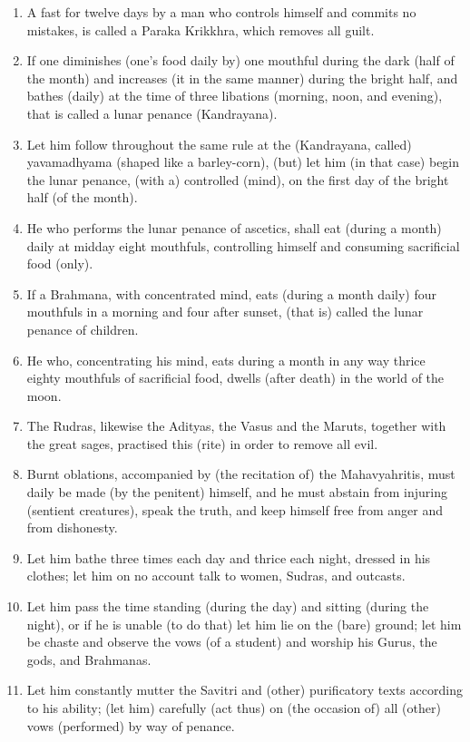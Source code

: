 \begin{enumerate}
\item A fast for twelve days by a man who controls himself and commits no mistakes, is called a Paraka Krikkhra, which removes all guilt.
\item If one diminishes (one's food daily by) one mouthful during the dark (half of the month) and increases (it in the same manner) during the bright half, and bathes (daily) at the time of three libations (morning, noon, and evening), that is called a lunar penance (Kandrayana).
\item Let him follow throughout the same rule at the (Kandrayana, called) yavamadhyama (shaped like a barley-corn), (but) let him (in that case) begin the lunar penance, (with a) controlled (mind), on the first day of the bright half (of the month).
\item He who performs the lunar penance of ascetics, shall eat (during a month) daily at midday eight mouthfuls, controlling himself and consuming sacrificial food (only).
\item If a Brahmana, with concentrated mind, eats (during a month daily) four mouthfuls in a morning and four after sunset, (that is) called the lunar penance of children.
\item He who, concentrating his mind, eats during a month in any way thrice eighty mouthfuls of sacrificial food, dwells (after death) in the world of the moon.
\item The Rudras, likewise the Adityas, the Vasus and the Maruts, together with the great sages, practised this (rite) in order to remove all evil.
\item Burnt oblations, accompanied by (the recitation of) the Mahavyahritis, must daily be made (by the penitent) himself, and he must abstain from injuring (sentient creatures), speak the truth, and keep himself free from anger and from dishonesty.
\item Let him bathe three times each day and thrice each night, dressed in his clothes; let him on no account talk to women, Sudras, and outcasts.
\item Let him pass the time standing (during the day) and sitting (during the night), or if he is unable (to do that) let him lie on the (bare) ground; let him be chaste and observe the vows (of a student) and worship his Gurus, the gods, and Brahmanas.
\item Let him constantly mutter the Savitri and (other) purificatory texts according to his ability; (let him) carefully (act thus) on (the occasion of) all (other) vows (performed) by way of penance.

\end{enumerate}
